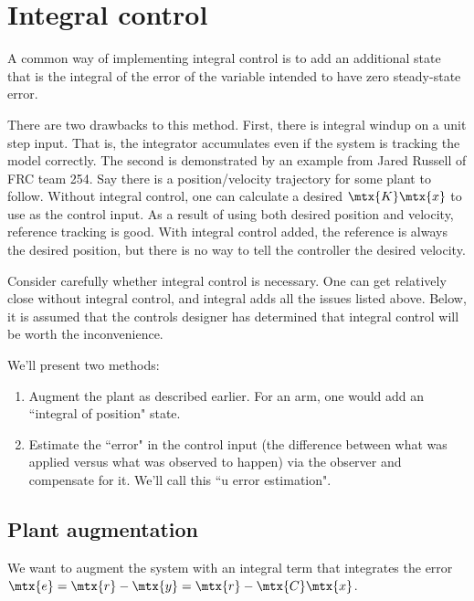 \section{Integral control}
\label{sec:integral_control}

A common way of implementing integral control is to add an additional
\gls{state} that is the integral of the \gls{error} of the variable intended to
have zero \gls{steady-state error}.

There are two drawbacks to this method. First, there is integral windup on a
unit \gls{step input}. That is, the integrator accumulates even if the
\gls{system} is \gls{tracking} the \gls{model} correctly. The second is
demonstrated by an example from Jared Russell of FRC team 254. Say there is a
position/velocity trajectory for some \gls{plant} to follow. Without integral
control, one can calculate a desired $\mtx{K}\mtx{x}$ to use as the
\gls{control input}. As a result of using both desired position and velocity,
\gls{reference} \gls{tracking} is good. With integral control added, the
\gls{reference} is always the desired position, but there is no way to tell the
controller the desired velocity.

Consider carefully whether integral control is necessary. One can get relatively
close without integral control, and integral adds all the issues listed above.
Below, it is assumed that the controls designer has determined that integral
control will be worth the inconvenience.

We'll present two methods:

\begin{enumerate}
  \item Augment the \gls{plant} as described earlier. For an arm, one would add
    an ``integral of position" state.
  \item Estimate the ``error" in the \gls{control input} (the difference between
    what was applied versus what was observed to happen) via the \gls{observer}
    and compensate for it. We'll call this ``u error estimation".
\end{enumerate}

\subsection{Plant augmentation}

We want to augment the \gls{system} with an integral term that integrates the
\gls{error} $\mtx{e} = \mtx{r} - \mtx{y} = \mtx{r} - \mtx{C}\mtx{x}$.

